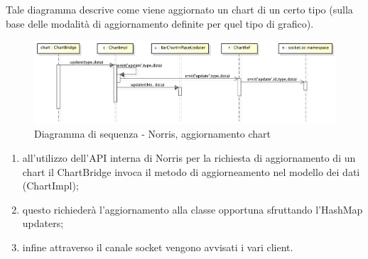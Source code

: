             Tale diagramma descrive come viene aggiornato un chart di un certo tipo (sulla base delle modalità di aggiornamento definite per quel tipo di grafico).
            \begin{figure}[H]
                \centering
                \includegraphics[scale=0.3]{DefinizioneDiProdotto/Pics/NorrisAggiornamentoChart}
                \caption{Diagramma di sequenza - Norris, aggiornamento chart}
            \end{figure}
            \begin{enumerate}
                \item all'utilizzo dell'API interna di Norris per la richiesta di aggiornamento di un chart il ChartBridge invoca il metodo di aggiorneamento nel modello dei dati (ChartImpl);
                \item questo richiederà l'aggiornamento alla classe opportuna sfruttando l'HashMap updaters;
                \item infine attraverso il canale socket vengono avvisati i vari client.
            \end{enumerate}